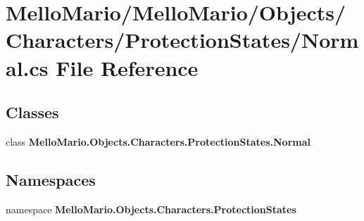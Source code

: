 \section{Mello\+Mario/\+Mello\+Mario/\+Objects/\+Characters/\+Protection\+States/\+Normal.cs File Reference}
\label{Characters_2ProtectionStates_2Normal_8cs}
\subsection*{Classes}
\begin{DoxyCompactItemize}
\item 
class \textbf{ Mello\+Mario.\+Objects.\+Characters.\+Protection\+States.\+Normal}
\end{DoxyCompactItemize}
\subsection*{Namespaces}
\begin{DoxyCompactItemize}
\item 
namespace \textbf{ Mello\+Mario.\+Objects.\+Characters.\+Protection\+States}
\end{DoxyCompactItemize}
